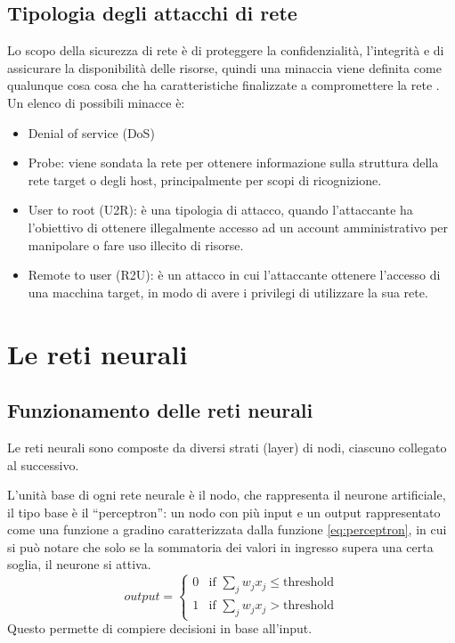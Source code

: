 \subsection{Tipologia degli attacchi di rete}
Lo scopo della sicurezza di rete è di proteggere la confidenzialità, l'integrità e di assicurare la disponibilità delle risorse, quindi una minaccia viene definita come qualunque cosa cosa che ha caratteristiche finalizzate a compromettere la rete \cite{anomaly_detection_survey_1_network}. Un elenco di possibili minacce è:

\begin{itemize}
    \item Denial of service (DoS)
    \item Probe: viene sondata la rete per ottenere informazione sulla struttura della rete target o degli host, principalmente per scopi di ricognizione.
    \item User to root (U2R): è una tipologia di attacco, quando l'attaccante ha l'obiettivo di ottenere illegalmente accesso ad un account amministrativo per manipolare o fare uso illecito di risorse.
    \item Remote to user (R2U): è un attacco in cui l'attaccante  ottenere l'accesso di una macchina target, in modo di avere i privilegi di utilizzare la sua rete.
\end{itemize}

\section{Le reti neurali}

\subsection{Funzionamento delle reti neurali}

Le reti neurali sono composte da diversi strati (layer) di nodi, ciascuno collegato al successivo.

L'unità base di ogni rete neurale è il nodo, che rappresenta il neurone artificiale, il tipo base è il ``perceptron'': un nodo con più input e un output rappresentato come una funzione a gradino caratterizzata dalla funzione \ref{eq:perceptron}, in cui si può notare che solo se la sommatoria dei valori in ingresso supera una certa soglia, il neurone si attiva.
\[
\label{eq:perceptron}
output = \begin{cases}
    0 & \mbox{if } \sum_{j}{w_{j}x_{j}}\leq \mbox{threshold} \\
    1 &  \mbox{if } \sum_{j}{w_{j}x_{j}} > \mbox{threshold}
\end{cases}
\]
Questo permette di compiere decisioni in base all'input.

